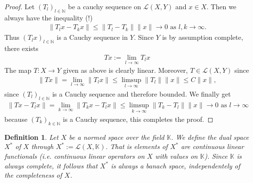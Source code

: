 \documentclass[11pt,a4paper]{article}
\newtheorem{defn}{Definition}[section]
\theoremstyle{definition}
\begin{document}
\begin{proof}
Let $(T_l)_{l \in \mathbb{N}}$ be a cauchy sequence on $\mathcal{L}(X,Y)$ and $x \in X$. Then we always have the inequality (!) 
\begin{align*}
\|T_lx - T_kx\| \leq \|T_l-T_k\| \|x\| \to 0 \text{ as } l,k \to \infty.
\end{align*}
Thus $(T_lx)_{l \in \mathbb{N}}$ is a Cauchy sequence in $Y$. Since $Y$ is by assumption complete, there exists \begin{align*}
Tx:= \lim_{l \to \infty} T_lx
\end{align*}
The map $T: X \to Y$ given as above is clearly linear. Moreover, $T \in \mathcal{L}(X,Y)$ since 
\begin{align*}
\|Tx\| = \lim_{l \to \infty} \|T_lx \|  \leq \limsup_{l \to \infty} \|T_l\| \|x\|  \leq C \|x\|,
\end{align*}
since $(T_l)_{l \in \mathbb{N}}$ is a Cauchy sequence and therefore bounded. We finally get 
\begin{align*}
\|Tx-T_lx\| = \lim_{k \to \infty} \|T_kx -T_lx\| \leq \limsup_{k \to \infty} \|T_k-T_l\|\|x\| \to 0 \text{ as } l \to \infty
\end{align*}
because $(T_k)_{k \in \mathbb{N}}$ is a Cauchy sequence, this completes the proof. 
\end{proof}
\begin{defn} Let $X$ be a normed space over the field $\mathbb{K}$. We define the dual space $X^*$ of $X$ through $X^*:= \mathcal{L}(X, \mathbb{K})$. That is elements of $X^*$ are continuous  linear functionals (i.e. continuous linear operators on $X$ with values on $\mathbb{K}$). Since $\mathbb{K}$ is always complete, it follows that $X^*$ is always a banach space, independentely of the completeness of $X$. 
\end{defn}
\end{document}
